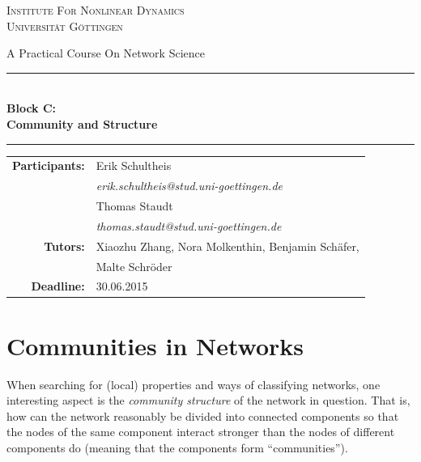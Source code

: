 \documentclass{scrartcl}
\begin{document}
\begin{titlepage}\centering
\textsc{\Large Institute For Nonlinear Dynamics \\[1.5ex] Universität Göttingen}

\vspace*{2cm}
{\huge A Practical Course On Network Science}
\vspace*{2cm}

\rule{\textwidth}{1pt}\\[0.5cm]
{\bfseries \huge Block C: \\[0.5cm] \huge \bfseries Community and Structure\\[0.5cm]}
\rule{\textwidth}{1pt}

\vspace*{4cm}

\begin{Large}\begin{tabular}{rl}
        \textbf{Participants:}  & Erik Schultheis                                \\    
                   & \textit{erik.schultheis@stud.uni-goettingen.de}\\[0.5cm]
                   & Thomas Staudt                                  \\
                   & \textit{thomas.staudt@stud.uni-goettingen.de}  \\[1.0cm]

       \textbf{Tutors:}        & Xiaozhu Zhang, Nora Molkenthin, Benjamin Schäfer, \\
                               & Malte Schröder                                    \\[1.0cm]
       \textbf{Deadline:}      & 30.06.2015
\end{tabular}\end{Large}

\vspace*{1.5cm}


\end{titlepage}

\tableofcontents
\clearpage
\section{Communities in Networks}
When searching for (local) properties and ways of classifying networks, one
interesting aspect is the \emph{community structure} of the network in
question. That is, how can the network reasonably be divided into connected
components so that the nodes of the same component interact stronger than
the nodes of different components do (meaning that the components form
\enquote{communities}).
\end{document}
